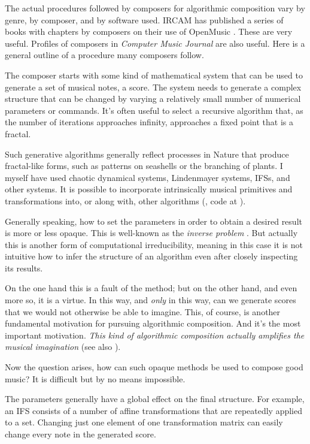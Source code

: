 \documentclass[]{interact}
\theoremstyle{plain}%
\theoremstyle{definition}
\theoremstyle{remark}
\begin{document}
The actual procedures followed by composers for algorithmic composition vary by genre, by composer, and by software used. IRCAM has published a series of books with chapters by composers on their use of OpenMusic \citep{omcomposersbook, agon2006om, agon2008om, agon2016om}. These are very useful. Profiles of composers in \emph{Computer Music Journal} are also useful. Here is a general outline of a procedure many composers follow.

The composer starts with some kind of mathematical system that can be used to generate a set of musical notes, a score. The system needs to generate a complex structure that can be changed by varying a relatively small number of numerical parameters or commands. It’s often useful to select a recursive algorithm that, as the number of iterations approaches infinity, approaches a fixed point that is a fractal. 

Such generative algorithms generally reflect processes in Nature that produce fractal-like forms, such as patterns on seashells or the branching of plants. I myself have used chaotic dynamical systems, Lindenmayer systems, IFSs, and other systems. It is possible to incorporate intrinsically musical primitives and transformations into, or along with, other algorithms (\citet{gogins2020}, code at \citet{gogins2025Code}).

Generally speaking, how to set the parameters in order to obtain a desired result is more or less opaque. This is well-known as the \emph{inverse problem} \citep{graham2021applying, tu2023learning}. But actually this is another form of computational irreducibility, meaning in this case it is not intuitive how to infer the structure of an algorithm even after closely inspecting its results. 

On the one hand this is a fault of the method; but on the other hand, and even more so, it is a virtue. In this way, and \emph{only} in this way, can we generate scores that we would not otherwise be able to imagine. This, of course, is another fundamental motivation for pursuing algorithmic composition. And it's the most important motivation. \emph{This kind of algorithmic composition actually amplifies the musical imagination} (see also \citet{edwards2011algorithmic}).

Now the question arises, how can such opaque methods be used to compose good music? It is difficult but by no means impossible.

The parameters generally have a global effect on the final structure. For example, an IFS consists of a number of affine transformations that are repeatedly applied to a set. Changing just one element of one transformation matrix can easily change every note in the generated score.
\end{document}
